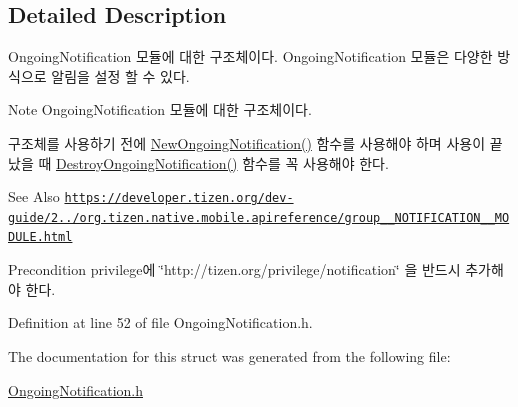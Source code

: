 \subsection{Detailed Description}
Ongoing\-Notification 모듈에 대한 구조체이다. Ongoing\-Notification 모듈은 다양한 방식으로 알림을 설정 할 수 있다. 

\begin{DoxyNote}{Note}
Ongoing\-Notification 모듈에 대한 구조체이다. \par
 구조체를 사용하기 전에 \hyperlink{OngoingNotification_8h_a87a80dfbcb3f8f9bde6cfbd468dc2da3}{New\-Ongoing\-Notification()} 함수를 사용해야 하며 사용이 끝났을 때 \hyperlink{OngoingNotification_8h_a4368aefd18207753cebec1fffc8f5fc5}{Destroy\-Ongoing\-Notification()} 함수를 꼭 사용해야 한다. 
\end{DoxyNote}
\begin{DoxySeeAlso}{See Also}
\href{https://developer.tizen.org/dev-guide/2.3.0/org.tizen.native.mobile.apireference/group__NOTIFICATION__MODULE.html}{\tt https\-://developer.\-tizen.\-org/dev-\/guide/2../org.\-tizen.\-native.\-mobile.\-apireference/group\-\_\-\-\_\-\-N\-O\-T\-I\-F\-I\-C\-A\-T\-I\-O\-N\-\_\-\-\_\-\-M\-O\-D\-U\-L\-E.\-html} 
\end{DoxySeeAlso}
\begin{DoxyPrecond}{Precondition}
privilege에 \char`\"{}http\-://tizen.\-org/privilege/notification\char`\"{} 을 반드시 추가해야 한다. 
\end{DoxyPrecond}


Definition at line 52 of file Ongoing\-Notification.\-h.



The documentation for this struct was generated from the following file\-:\begin{DoxyCompactItemize}
\item 
\hyperlink{OngoingNotification_8h}{Ongoing\-Notification.\-h}\end{DoxyCompactItemize}
